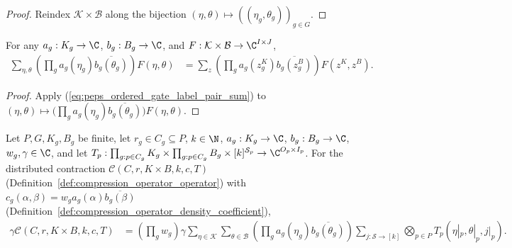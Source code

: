\begin{proof}
    \leanok
    Reindex $\mathcal K\times\mathcal B$ along the bijection $(\eta,\theta)\mapsto((\eta_g,\theta_g))_{g\in G}$.
\end{proof}

\begin{lemma}
    \label{thm:peps_ordered_gate_label_pair_weighted_sum}
    \leanok
    For any $a_g:K_g\to\C$, $b_g:B_g\to\C$, and $F:\mathcal K\times\mathcal B\to\C^{I\times J}$,
    \begin{align}
        \sum_{\eta,\theta}
        \left(\prod_g a_g(\eta_g)\overline{b_g(\theta_g)}\right)F(\eta,\theta)
         & =\sum_z\left(\prod_g a_g(z^K_g)\overline{b_g(z^B_g)}\right)
        F(z^K,z^B).
        \label{eq:peps_ordered_gate_label_pair_weighted_sum}
    \end{align}
\end{lemma}

\begin{proof}
    \leanok
    Apply (\ref{eq:peps_ordered_gate_label_pair_sum}) to $(\eta,\theta)\mapsto\bigl(\prod_g a_g(\eta_g)\overline{b_g(\theta_g)}\bigr)F(\eta,\theta)$.
\end{proof}


\begin{lemma}
    \label{thm:peps_density_pair_univ_double_sum}
    \leanok
    Let $P,G,K_g,B_g$ be finite, let $r_g\in C_g\subseteq P$, $k\in\N$, $a_g:K_g\to\C$, $b_g:B_g\to\C$, $w_g,\gamma\in\C$, and let $T_p:\prod_{g:p\in C_g}K_g\times\prod_{g:p\in C_g}B_g\times[k]^{\mathcal S_p}\to\C^{O_p\times I_p}$. For the distributed contraction $\mathcal C(C,r,K\times B,k,c,T)$ (Definition~\ref{def:compression_operator_operator}) with $c_g(\alpha,\beta)=w_g a_g(\alpha)\overline{b_g(\beta)}$ (Definition~\ref{def:compression_operator_density_coefficient}),
    \begin{align}
        \gamma\mathcal C(C,r,K\times B,k,c,T)
         & =\left(\prod_g w_g\right)\gamma
        \sum_{\eta\in\mathcal K}\sum_{\theta\in\mathcal B}
        \left(\prod_g a_g(\eta_g)\overline{b_g(\theta_g)}\right)
        \sum_{j:\mathcal S\to[k]}
        \bigotimes_{p\in P}T_p(\eta|_p,\theta|_p,j|_p).
        \label{eq:peps_density_pair_univ_double_sum}
    \end{align}
\end{lemma}

